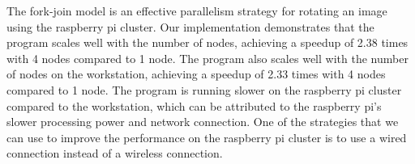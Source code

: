 \documentclass[12pt]{article}
\begin{document}
The fork-join model is an effective parallelism strategy for rotating an image using the raspberry pi cluster. Our implementation demonstrates that the program scales well with the number of nodes, achieving a speedup of 2.38 times with 4 nodes compared to 1 node. The program also scales well with the number of nodes on the workstation, achieving a speedup of 2.33 times with 4 nodes compared to 1 node. The program is running slower on the raspberry pi cluster compared to the workstation, which can be attributed to the raspberry pi's slower processing power and network connection. One of the strategies that we can use to improve the performance on the raspberry pi cluster is to use a wired connection instead of a wireless connection.
\end{document}
